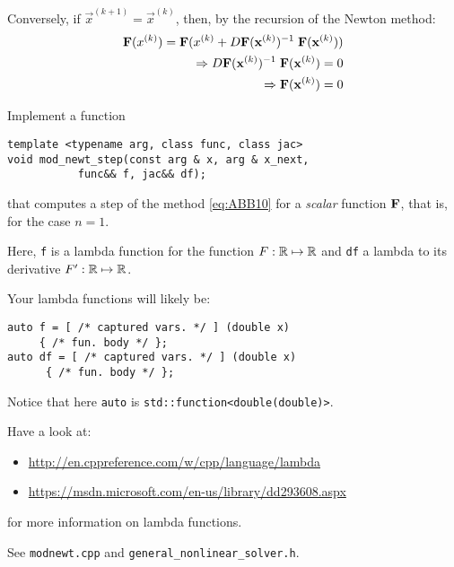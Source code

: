 \begin{problem}
\begin{subproblem}[2]
\begin{solution}
Conversely, if $\vec{x}^{(k+1)} = \vec{x}^{(k)}$, then, by the recursion of the Newton method:
\begin{align*}
 \mathbf{F}(x^{(k)}) = \mathbf{F}(x^{(k)} + D{\mathbf{F}}({\mathbf{x}}^{(k)})^{-1}\;{\mathbf{F}}({\mathbf{x}}^{(k)})) \\
 \Rightarrow D{\mathbf{F}}({\mathbf{x}}^{(k)})^{-1}\;{\mathbf{F}}({\mathbf{x}}^{(k)}) = 0 \\
 \Rightarrow {\mathbf{F}}({\mathbf{x}}^{(k)}) = 0
\end{align*}
\end{solution}
\end{subproblem}

\begin{subproblem}[3] \label{subprb:ModifiedNewton_2}
Implement a \Cpp{} function
\begin{lstlisting}        
template <typename arg, class func, class jac>
void mod_newt_step(const arg & x, arg & x_next,
		   func&& f, jac&& df);
\end{lstlisting}
that computes a step of the method \eqref{eq:ABB10} for a \emph{scalar} function ${\mathbf{F}}$, that is, for the case $n=1$. 

Here, \texttt{f} is a lambda function for the function $F:\mathbb{R}\mapsto\mathbb{R}$ and \texttt{df} a lambda to its derivative $F':\mathbb{R}\mapsto\mathbb{R}$.
\begin{hint}
Your lambda functions will likely be:
\begin{lstlisting}
auto f = [ /* captured vars. */ ] (double x)
	 { /* fun. body */ }; 
auto df = [ /* captured vars. */ ] (double x)
	  { /* fun. body */ }; 
\end{lstlisting}
Notice that here \verb|auto| is \verb|std::function<double(double)>|.
\end{hint}

\begin{hint}
 Have a look at:
  \begin{itemize}
   \item \href{http://en.cppreference.com/w/cpp/language/lambda}{http://en.cppreference.com/w/cpp/language/lambda}
   \item \href{https://msdn.microsoft.com/en-us/library/dd293608.aspx}{https://msdn.microsoft.com/en-us/library/dd293608.aspx}
  \end{itemize}
  for more information on lambda functions.
\end{hint}


\cprotEnv \begin{solution}
  See \verb|modnewt.cpp| and \verb|general_nonlinear_solver.h|.
% 
\end{solution}
\end{subproblem}


\end{problem}
